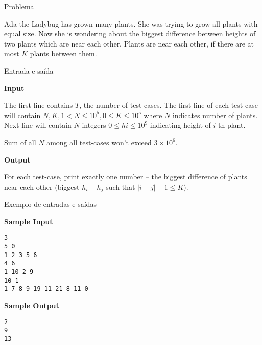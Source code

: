 
\begin{frame}[fragile]{Problema}

Ada the Ladybug has grown many plants. She was trying to grow all plants with equal size. Now she
is wondering about the biggest difference between heights of two plants which are near each other.
Plants are near each other, if there are at most $K$ plants between them.

\end{frame}

\begin{frame}[fragile]{Entrada e saída}

\textbf{Input}

The first line contains $T$, the number of test-cases. The first line of each test-case will
contain $N, K, 1 < N\leq 10^5, 0\leq K\leq 10^5$ where $N$ indicates number of plants.
Next line will contain $N$ integers $0\leq hi\leq 10^9$ indicating height of $i$-th plant.

Sum of all $N$ among all test-cases won't exceed $3\times 10^6$.

\vspace{0.1in}

\textbf{Output}

For each test-case, print exactly one number -- the biggest difference of plants near each other
(biggest $h_i-h_j$ such that $|i-j|-1\leq K$).

\end{frame}

\begin{frame}[fragile]{Exemplo de entradas e saídas}

\begin{minipage}[t]{0.5\textwidth}
\textbf{Sample Input}
\begin{verbatim}
3
5 0
1 2 3 5 6
4 6
1 10 2 9
10 1
1 7 8 9 19 11 21 8 11 0 
\end{verbatim}
\end{minipage}
\begin{minipage}[t]{0.45\textwidth}
\textbf{Sample Output}
\begin{verbatim}
2
9
13
\end{verbatim}
\end{minipage}
\end{frame}


